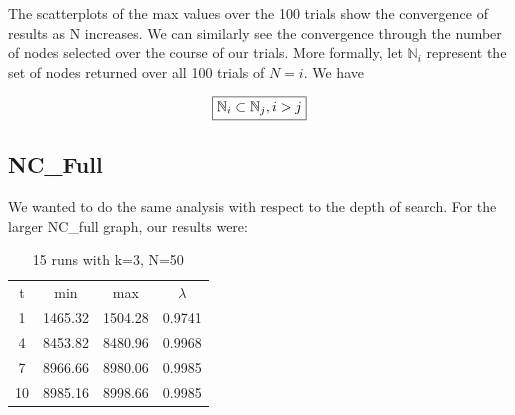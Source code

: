 \documentclass{article}
\begin{document}
		The scatterplots of the max values over the 100 trials show the convergence of results as N increases. We can similarly see the convergence through the number of nodes selected over the course of our trials. More formally, let $\mathbb{N}_i$ represent the set of nodes returned over all 100 trials of $N=i$. We have

		\begin{equation}
		\boxed{
			 \mathbb{N}_i \subset \mathbb{N}_j, i > j\\
		}
		\end{equation}

	\subsection{NC\_Full}

		We wanted to do the same analysis with respect to the depth of search. For the larger NC\_full graph, our results were:

		\begin{table}[h!]
		  \begin{center}
		    \caption{15 runs with k=3, N=50}
		    \label{tab:table2}
		    \begin{tabular}{|c|c|c|c|} 
		      \hline
		      t & min & max & $\lambda$\\
		      1  & 1465.32 & 1504.28 & 0.9741\\
		      4  & 8453.82 & 8480.96 & 0.9968\\
		      7  & 8966.66 & 8980.06 & 0.9985\\
		      10 & 8985.16 & 8998.66 & 0.9985\\
		      \hline
		    \end{tabular}
		  \end{center}
		\end{table}
\end{document}
